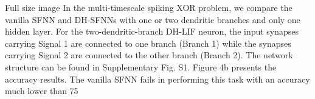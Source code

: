 Full size image
In the multi-timescale spiking XOR problem, we compare the vanilla SFNN and DH-SFNNs with one or two dendritic branches and only one hidden layer. For the two-dendritic-branch DH-LIF neuron, the input synapses carrying Signal 1 are connected to one branch (Branch 1) while the synapses carrying Signal 2 are connected to the other branch (Branch 2). The network structure can be found in Supplementary Fig. S1. Figure 4b presents the accuracy results. The vanilla SFNN fails in performing this task with an accuracy much lower than 75%


